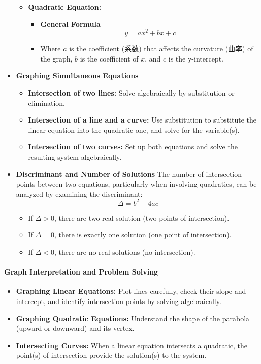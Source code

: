 \begin{itemize}
\begin{itemize}
        \item \textbf{Quadratic Equation:}
        \begin{itemize}
            \item \textbf{General Formula}
            \begin{equation}
                y = ax^2 + bx + c
            \end{equation}
            \item Where $a$ is the \underline{coefficient} (系数) that affects the \underline{curvature} (曲率) of the graph, $b$
            is the coefficient of $x$, and $c$ is the y-intercept.
        \end{itemize}
    \end{itemize}
    \item \textbf{Graphing Simultaneous Equations}
    \begin{itemize}
        \item \textbf{Intersection of two lines:} Solve algebraically by substitution or elimination.
        \item \textbf{Intersection of a line and a curve:} Use substitution to substitute the linear equation into the quadratic
        one, and solve for the variable(s).
        \item \textbf{Intersection of two curves:} Set up both equations and solve the resulting system algebraically.
    \end{itemize}
    \item \textbf{Discriminant and Number of Solutions} The number of intersection points between two equations, particularly when
    involving quadratics, can be analyzed by examining the discriminant:
    \begin{equation}
        \Delta = b^2 - 4ac
    \end{equation}
    \begin{itemize}
        \item If $\Delta > 0$, there are two real solution (two points of intersection).
        \item If $\Delta = 0$, there is exactly one solution (one point of intersection).
        \item If $\Delta < 0$, there are no real solutions (no intersection).
    \end{itemize}
\end{itemize}

\paragraph{Graph Interpretation and Problem Solving}
\begin{itemize}
    \item \textbf{Graphing Linear Equations:} Plot lines carefully, check their slope and intercept, and identify intersection
    points by solving algebraically.
    \item \textbf{Graphing Quadratic Equations:} Understand the shape of the parabola (upward or downward) and its vertex.
    \item \textbf{Intersecting Curves:} When a linear equation intersects a quadratic, the point(s) of intersection provide the
    solution(s) to the system.
\end{itemize}